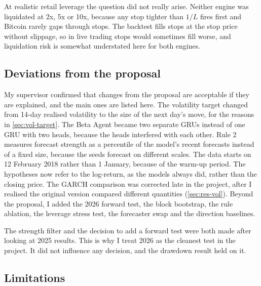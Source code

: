 At realistic retail leverage the question did not really arise. Neither engine was liquidated at 2x, 5x or 10x, because any stop tighter than $1/L$ fires first and Bitcoin rarely gaps through stops. The backtest fills stops at the stop price without slippage, so in live trading stops would sometimes fill worse, and liquidation risk is somewhat understated here for both engines.

\subsection{Deviations from the proposal}\label{sec:deviations}

My supervisor confirmed that changes from the proposal are acceptable if they are explained, and the main ones are listed here. The volatility target changed from 14-day realised volatility to the size of the next day's move, for the reasons in \cref{sec:vol-target}. The Beta Agent became two separate GRUs instead of one GRU with two heads, because the heads interfered with each other. Rule 2 measures forecast strength as a percentile of the model's recent forecasts instead of a fixed size, because the seeds forecast on different scales. The data starts on 12 February 2018 rather than 1 January, because of the warm-up period. The hypotheses now refer to the log-return, as the models always did, rather than the closing price. The GARCH comparison was corrected late in the project, after I realised the original version compared different quantities (\cref{sec:res-vol}). Beyond the proposal, I added the 2026 forward test, the block bootstrap, the rule ablation, the leverage stress test, the forecaster swap and the direction baselines.

The strength filter and the decision to add a forward test were both made after looking at 2025 results. This is why I treat 2026 as the cleanest test in the project. It did not influence any decision, and the drawdown result held on it.

\subsection{Limitations}

